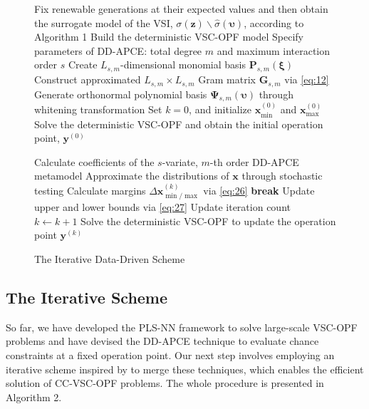 \documentclass[journal]{IEEEtran}
\makeatletter
\theoremstyle{definition}
\theoremstyle{remark}
\newcommand{\removelatexerror}{\let\@latex@error\@gobble}
\makeatother
\begin{document}
\begin{figure}[!t]
    \removelatexerror
     \begin{algorithm}[H]
        \caption{The Iterative Data-Driven Scheme}
        Fix renewable generations at their expected values and then obtain the surrogate model of the VSI, $\sigma(\boldsymbol{z})\backslash\hat{\sigma}(\boldsymbol{\upsilon})$, according to Algorithm 1\;
        Build the deterministic VSC-OPF model\;
        Specify parameters of DD-APCE: total degree $m$ and maximum interaction order $s$\;
        Create $L_{s,m}$-dimensional monomial basis $\boldsymbol{P}_{s,m}(\boldsymbol{\xi })$\;
        Construct approximated $L_{s,m}\times L_{s,m}$ Gram matrix $\boldsymbol{G}_{s,m}$ via \eqref{eq:12}\;
        Generate orthonormal polynomial basis $\boldsymbol{\Psi}_{s,m}(\boldsymbol{\upsilon})$ through whitening transformation\;
               Set $k=0$, and initialize $\boldsymbol{x}_{\min}^{(0)}$ and $\boldsymbol{x}_{\max}^{(0)}$\; 
        Solve the deterministic VSC-OPF and obtain the initial operation point, $\boldsymbol{y}^{(0)}$ \;
        {
                                          Calculate coefficients of the $s$-variate, $m$-th order DD-APCE metamodel\;
                Approximate the distributions of $\boldsymbol{x}$ through stochastic testing\;
                Calculate margins $\Delta\boldsymbol{x}_{\min/\max}^{(k)}$ via \eqref{eq:26}\;
                {
                \textbf{break}\;
                }{
                Update upper and lower bounds via \eqref{eq:27}\;
                Update iteration count $k\gets k+1$\;
                Solve the deterministic VSC-OPF to update the operation point $\boldsymbol{y}^{(k)}$
                }
                           
        }
     \end{algorithm}
     \vspace{-10pt}
\end{figure}
\subsection{The Iterative Scheme}
So far, we have developed the PLS-NN framework to solve large-scale VSC-OPF problems and have devised the DD-APCE technique to evaluate chance constraints at a fixed operation point. Our next step involves employing an iterative scheme inspired by \cite{roald2018chance} to merge these techniques, which enables the efficient solution of CC-VSC-OPF problems. The whole procedure is presented in Algorithm 2.
\end{document}
